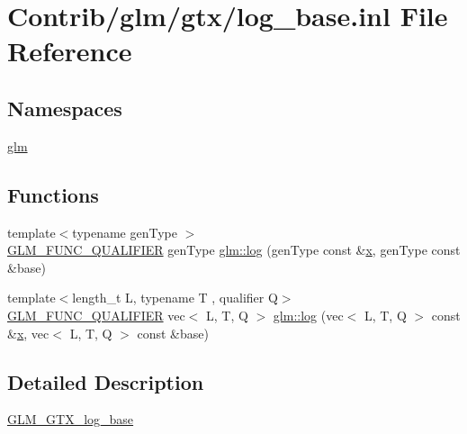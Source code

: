 \hypertarget{log__base_8inl}{}\section{Contrib/glm/gtx/log\+\_\+base.inl File Reference}
\label{log__base_8inl}
\subsection*{Namespaces}
\begin{DoxyCompactItemize}
\item 
 \mbox{\hyperlink{namespaceglm}{glm}}
\end{DoxyCompactItemize}
\subsection*{Functions}
\begin{DoxyCompactItemize}
\item 
{\footnotesize template$<$typename gen\+Type $>$ }\\\mbox{\hyperlink{setup_8hpp_a33fdea6f91c5f834105f7415e2a64407}{G\+L\+M\+\_\+\+F\+U\+N\+C\+\_\+\+Q\+U\+A\+L\+I\+F\+I\+ER}} gen\+Type \mbox{\hyperlink{group__gtx__log__base_ga60a7b0a401da660869946b2b77c710c9}{glm\+::log}} (gen\+Type const \&\mbox{\hyperlink{_s_d_l__opengl_8h_ad0e63d0edcdbd3d79554076bf309fd47}{x}}, gen\+Type const \&base)
\item 
{\footnotesize template$<$length\+\_\+t L, typename T , qualifier Q$>$ }\\\mbox{\hyperlink{setup_8hpp_a33fdea6f91c5f834105f7415e2a64407}{G\+L\+M\+\_\+\+F\+U\+N\+C\+\_\+\+Q\+U\+A\+L\+I\+F\+I\+ER}} vec$<$ L, T, Q $>$ \mbox{\hyperlink{namespaceglm_a2b3dd2e2389685ab1a11a30ca5f0ba2d}{glm\+::log}} (vec$<$ L, T, Q $>$ const \&\mbox{\hyperlink{_s_d_l__opengl_8h_ad0e63d0edcdbd3d79554076bf309fd47}{x}}, vec$<$ L, T, Q $>$ const \&base)
\end{DoxyCompactItemize}


\subsection{Detailed Description}
\mbox{\hyperlink{group__gtx__log__base}{G\+L\+M\+\_\+\+G\+T\+X\+\_\+log\+\_\+base}} 